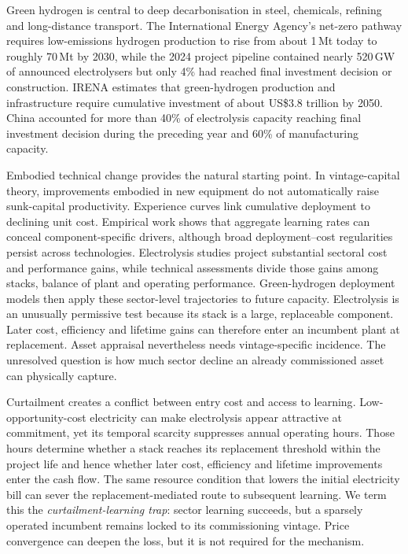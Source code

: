 \documentclass[11pt,a4paper]{article}
\begin{document}
Green hydrogen is central to deep decarbonisation in steel, chemicals, refining and long-distance transport\cite{staffell2019,yang2022,ueckerdt2021}. The International Energy Agency's net-zero pathway requires low-emissions hydrogen production to rise from about 1\,Mt today to roughly 70\,Mt by 2030, while the 2024 project pipeline contained nearly 520\,GW of announced electrolysers but only 4\% had reached final investment decision or construction\cite{iea2023nze,iea2024}. IRENA estimates that green-hydrogen production and infrastructure require cumulative investment of about US\$3.8 trillion by 2050\cite{irena2023}. China accounted for more than 40\% of electrolysis capacity reaching final investment decision during the preceding year and 60\% of manufacturing capacity\cite{nea2024capacity,pan2021,guo2023coal,ndrc2022}.

Embodied technical change provides the natural starting point. In vintage-capital theory, improvements embodied in new equipment do not automatically raise sunk-capital productivity\cite{solow1960}. Experience curves link cumulative deployment to declining unit cost\cite{wright1936,arrow1962,mcdonald2001}. Empirical work shows that aggregate learning rates can conceal component-specific drivers\cite{nemet2006,ferioli2009,rubin2015}, although broad deployment--cost regularities persist across technologies\cite{farmer2016,way2022}. Electrolysis studies project substantial sectoral cost and performance gains\cite{schmidt2017,brandt2024,song2021,glenk2023}, while technical assessments divide those gains among stacks, balance of plant and operating performance\cite{irena2020,doe2024,worldbank2026}. Green-hydrogen deployment models then apply these sector-level trajectories to future capacity\cite{odenweller2022,zeyen2023,odenweller2025}. Electrolysis is an unusually permissive test because its stack is a large, replaceable component. Later cost, efficiency and lifetime gains can therefore enter an incumbent plant at replacement. Asset appraisal nevertheless needs vintage-specific incidence. The unresolved question is how much sector decline an already commissioned asset can physically capture.

Curtailment creates a conflict between entry cost and access to learning\cite{glenk2019,fan2025,nea2025hydrogen}. Low-opportunity-cost electricity can make electrolysis appear attractive at commitment, yet its temporal scarcity suppresses annual operating hours. Those hours determine whether a stack reaches its replacement threshold within the project life and hence whether later cost, efficiency and lifetime improvements enter the cash flow. The same resource condition that lowers the initial electricity bill can sever the replacement-mediated route to subsequent learning. We term this the \emph{curtailment-learning trap}: sector learning succeeds, but a sparsely operated incumbent remains locked to its commissioning vintage. Price convergence can deepen the loss, but it is not required for the mechanism.
\end{document}
